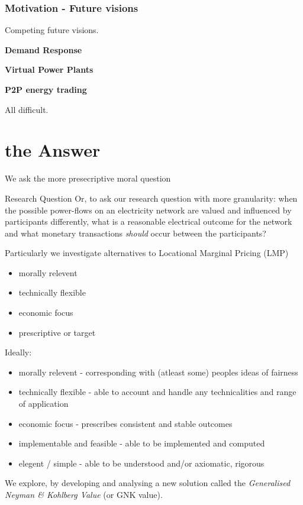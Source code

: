 \documentclass{beamer}
\begin{document}
\begin{frame}
\frametitle{Motivation - Future visions}
Competing future visions.

\textbf{Demand Response}

\textbf{Virtual Power Plants}

\textbf{P2P energy trading}

All difficult.
\end{frame}

\section{the Answer}

\begin{frame}
We ask the more presecriptive moral question
\begin{block}{Research Question}
Or, to ask our research question with more granularity:
when the possible power-flows on an electricity network are valued and influenced by participants differently, 
what is a reasonable electrical outcome for the network and what monetary transactions \textit{should} occur between the participants?
\end{block}
Particularly we investigate alternatives to Locational Marginal Pricing (LMP)

\begin{itemize}
\item	morally relevent
\item	technically flexible
\item	economic focus
\item	prescriptive or target
\end{itemize}
\end{frame}


\begin{frame}
Ideally:
\begin{itemize}
\item	morally relevent - corresponding with (atleast some) peoples ideas of fairness
\item	technically flexible - able to account and handle any technicalities and range of application
\item	economic focus - prescribes consistent and stable outcomes
\item	implementable and feasible - able to be implemented and computed
\item	elegent / simple - able to be understood and/or axiomatic, rigorous
\end{itemize}
We explore, by developing and analysing a new solution called the \textit{Generalised Neyman \& Kohlberg Value} (or GNK value).
\end{frame}
\end{document}
